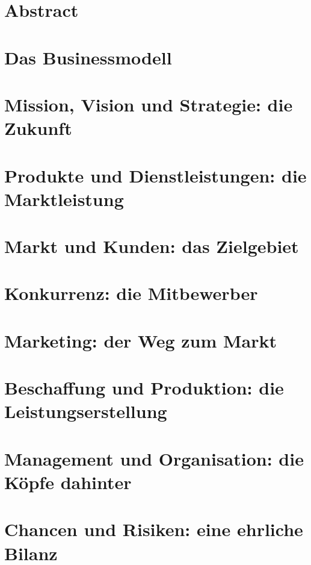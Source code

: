 

\newcommand{\SUBJECT}{Businessplan}
\newcommand{\TITLE}{Digital Fitness Coach}



\section{Abstract}

\cite{ackema:1998}

\section{Das Businessmodell} %

\section{Mission, Vision und Strategie: die Zukunft}

\section{Produkte und Dienstleistungen: die Marktleistung}

\section{Markt und Kunden: das Zielgebiet}

\section{Konkurrenz: die Mitbewerber}

\section{Marketing: der Weg zum Markt}

\section{Beschaffung und Produktion: die Leistungserstellung}

\section{Management und Organisation: die Köpfe dahinter}

\section{Chancen und Risiken: eine ehrliche Bilanz}

